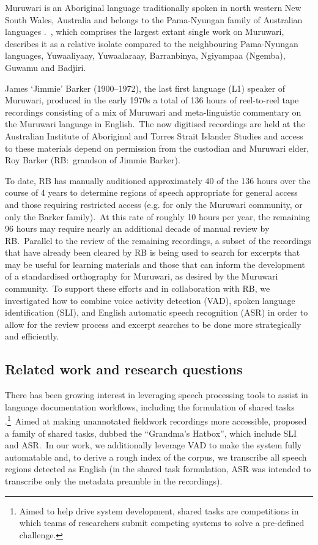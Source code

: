 \documentclass[main.tex]{subfiles}
\begin{document}
Muruwari is an Aboriginal language traditionally spoken in north western New South
Wales, Australia and belongs to the Pama-Nyungan family of Australian languages \parencite{oates1988muruwari}.~\textcite[][]{oates1988muruwari}, which comprises the largest extant single work on Muruwari, describes it as a relative isolate compared to the neighbouring Pama-Nyungan languages, Yuwaaliyaay, Yuwaalaraay, Barranbinya, Ngiyampaa (Ngemba), Guwamu and Badjiri.

James `Jimmie' Barker (1900--1972), the last first language (L1) speaker of Muruwari, produced in the early 1970s a total of 136 hours of reel-to-reel tape recordings consisting of a mix of Muruwari and meta-linguistic commentary on the Muruwari language in English.~The now digitised recordings are held at the Australian Institute of Aboriginal and Torres Strait Islander Studies and access to these materials depend on permission from the custodian and Muruwari elder, Roy Barker (RB:~grandson of Jimmie Barker).

To date, RB has manually auditioned approximately 40 of the 136 hours over the course of 4 years to determine regions of speech appropriate for general access and those requiring restricted access (e.g. for only the Muruwari community, or only the Barker family).~At this rate of roughly 10 hours per year, the remaining 96 hours may require nearly an additional decade of manual review by RB.~Parallel to the review of the remaining recordings, a subset of the recordings that have already been cleared by RB is being used to search for excerpts that may be useful for learning materials and those that can inform the development of a standardised orthography for Muruwari, as desired by the Muruwari community.~To support these efforts and in collaboration with RB, we investigated how to combine voice activity detection (VAD), spoken language identification (SLI), and English automatic speech recognition (ASR) in order to allow for the review process and excerpt searches to be done more strategically and efficiently.

\subsection{Related work and research questions}

There has been growing interest in leveraging speech processing tools to assist in language documentation workflows, including the formulation of shared tasks \parencite[e.g.][]{levow2021developing,salesky2021sigtyp}.\footnote{Aimed to help drive system development, shared tasks are competitions in which teams of researchers submit competing systems to solve a pre-defined challenge.}~Aimed at making unannotated fieldwork recordings more accessible, \textcite{levow2017streamlined} proposed a family of shared tasks, dubbed the ``Grandma's Hatbox'', which include SLI and ASR.~In our work, we additionally leverage VAD to make the system fully automatable and, to derive a rough index of the corpus, we transcribe all speech regions detected as English (in the shared task formulation, ASR was intended to transcribe only the metadata preamble in the recordings).
\end{document}
